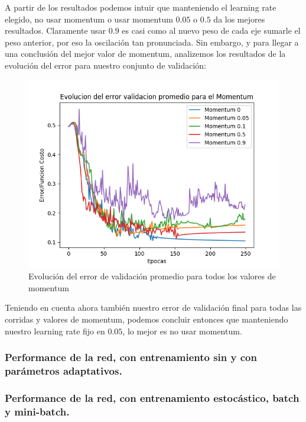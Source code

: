 A partir de los resultados podemos intuir que manteniendo el learning rate elegido, no usar momentum o usar momentum $0.05$ o $0.5$ da los mejores resultados. Claramente
usar $0.9$ es casi como al nuevo peso de cada eje sumarle el peso anterior, por eso la oscilación tan pronunciada. Sin embargo, y para llegar a una conclusión del mejor 
valor de momentum, analizemos los resultados de la evolución del error para nuestro conjunto de validación:

\begin{figure}[!htbp]
  \begin{center}
  \includegraphics[scale=0.80]{graficos/momentum_promedios_validacion.png}
  \caption{Evolución del error de validación promedio para todos los valores de momentum}
  \end{center}
\end{figure}

Teniendo en cuenta ahora también nuestro error de validación final para todas las corridas y valores de momentum, podemos concluir entonces que manteniendo nuestro learning
rate fijo en $0.05$, lo mejor es no usar momentum.

\subsubsection{Performance de la red, con entrenamiento sin y con parámetros adaptativos.}

\subsubsection{Performance de la red, con entrenamiento estocástico, batch y mini-batch.}

